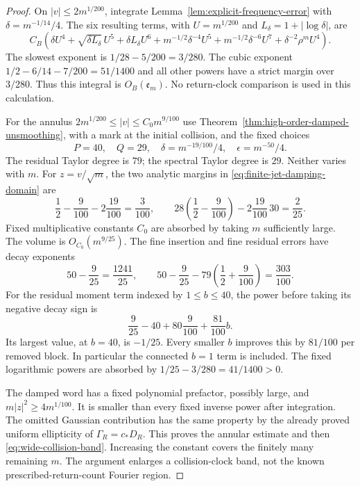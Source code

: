 \begin{proof}
On $|v|\le2m^{1/200}$, integrate
Lemma~\ref{lem:explicit-frequency-error} with
$\delta=m^{-1/14}/4$. The six resulting terms, with
$U=m^{1/200}$ and $L_\delta=1+|\log\delta|$, are
\[
 C_B\left(\delta U^4+\sqrt{\delta L_\delta}\,U^5
 +\delta L_\delta U^6+m^{-1/2}\delta^{-4}U^5
 +m^{-1/2}\delta^{-6}U^7+\delta^{-2}\rho^mU^4\right).
\]
The slowest exponent is $1/28-5/200=3/280$. The cubic exponent
$1/2-6/14-7/200=51/1400$ and all other powers have a strict
margin over $3/280$. Thus this integral is $O_B(\mathfrak e_m)$.
No return-clock comparison is used in this calculation.

For the annulus $2m^{1/200}\le|v|\le C_0m^{9/100}$ use
Theorem~\ref{thm:high-order-damped-unsmoothing}, with a mark at the
initial collision, and the fixed choices
\begin{equation}\label{eq:wide-collision-orders}
 P=40,\quad Q=29,\quad
 \delta=m^{-19/100}/4,\quad \epsilon=m^{-50}/4.
\end{equation}
The residual Taylor degree is $79$; the spectral Taylor degree is
$29$. Neither varies with $m$. For $z=v/\sqrt m$, the two analytic
margins in \eqref{eq:finite-jet-damping-domain} are
\[
 \frac12-\frac9{100}-2\frac{19}{100}=\frac3{100},\qquad
 28\left(\frac12-\frac9{100}\right)
              -2\frac{19}{100}\,30=\frac2{25}.
\]
Fixed multiplicative constants $C_0$ are absorbed by taking $m$
sufficiently large. The volume is $O_{C_0}(m^{9/25})$.
The fine insertion and fine residual errors have decay exponents
\[
 50-\frac9{25}=\frac{1241}{25},\qquad
 50-\frac9{25}-79\left(\frac12+\frac9{100}\right)
                                      =\frac{303}{100}.
\]
For the residual moment term indexed by $1\le b\le40$, the power
before taking its negative decay sign is
\begin{equation}\label{eq:wide-collision-residual-powers}
 \frac9{25}-40+80\frac9{100}+\frac{81}{100}b.
\end{equation}
Its largest value, at $b=40$, is $-1/25$. Every smaller $b$ improves
this by $81/100$ per removed block. In particular the connected
$b=1$ term is included. The fixed logarithmic powers are absorbed
by $1/25-3/280=41/1400>0$.

The damped word has a fixed polynomial prefactor, possibly large,
and $m|z|^2\ge4m^{1/100}$. It is smaller than every fixed inverse
power after integration. The omitted Gaussian contribution has the
same property by the already proved uniform ellipticity of
$\Gamma_R=c_*D_R$. This proves the annular estimate and then
\eqref{eq:wide-collision-band}. Increasing the constant covers the
finitely many remaining $m$. The argument enlarges a collision-clock
band, not the known prescribed-return-count Fourier region.
\end{proof}

